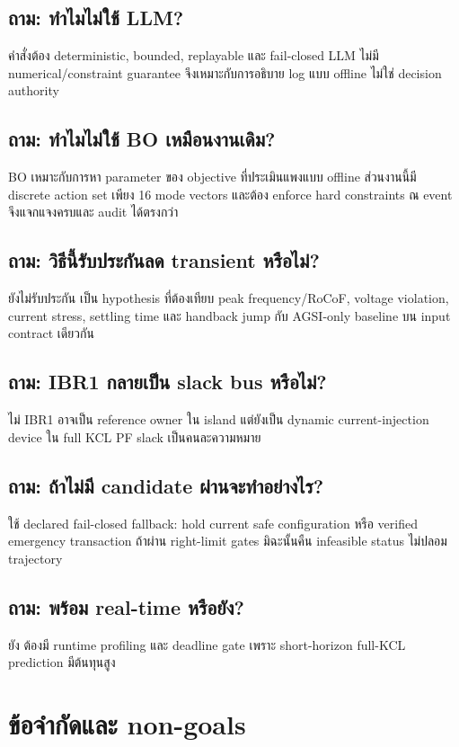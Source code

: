 \documentclass[12pt,a4paper]{article}
\begin{document}
\subsection*{ถาม: ทำไมไม่ใช้ LLM?}
คำสั่งต้อง deterministic, bounded, replayable และ fail-closed LLM ไม่มี numerical/constraint guarantee
จึงเหมาะกับการอธิบาย log แบบ offline ไม่ใช่ decision authority

\subsection*{ถาม: ทำไมไม่ใช้ BO เหมือนงานเดิม?}
BO เหมาะกับการหา parameter ของ objective ที่ประเมินแพงแบบ offline ส่วนงานนี้มี discrete action set เพียง
16 mode vectors และต้อง enforce hard constraints ณ event จึงแจกแจงครบและ audit ได้ตรงกว่า

\subsection*{ถาม: วิธีนี้รับประกันลด transient หรือไม่?}
ยังไม่รับประกัน เป็น hypothesis ที่ต้องเทียบ peak frequency/RoCoF, voltage violation, current stress,
settling time และ handback jump กับ AGSI-only baseline บน input contract เดียวกัน

\subsection*{ถาม: IBR1 กลายเป็น slack bus หรือไม่?}
ไม่ IBR1 อาจเป็น reference owner ใน island แต่ยังเป็น dynamic current-injection device ใน full KCL
PF slack เป็นคนละความหมาย

\subsection*{ถาม: ถ้าไม่มี candidate ผ่านจะทำอย่างไร?}
ใช้ declared fail-closed fallback: hold current safe configuration หรือ verified emergency transaction
ถ้าผ่าน right-limit gates มิฉะนั้นคืน infeasible status ไม่ปลอม trajectory

\subsection*{ถาม: พร้อม real-time หรือยัง?}
ยัง ต้องมี runtime profiling และ deadline gate เพราะ short-horizon full-KCL prediction มีต้นทุนสูง

\section{ข้อจำกัดและ non-goals}
\end{document}
